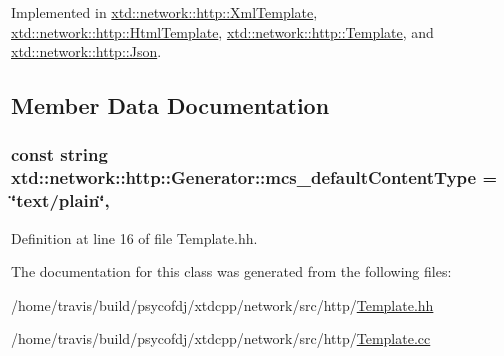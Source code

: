 Implemented in \hyperlink{classxtd_1_1network_1_1http_1_1XmlTemplate_ab221547a643e3db5ba99640fe14b9f68}{xtd\-::network\-::http\-::\-Xml\-Template}, \hyperlink{classxtd_1_1network_1_1http_1_1HtmlTemplate_af621b5bf866fa828f0bd5eaf225d5f70}{xtd\-::network\-::http\-::\-Html\-Template}, \hyperlink{classxtd_1_1network_1_1http_1_1Template_a476ce5e5b8465ea80ade07c003ab5cfd}{xtd\-::network\-::http\-::\-Template}, and \hyperlink{classxtd_1_1network_1_1http_1_1Json_a7a9ed4f957c77813ecbb84e228936b5e}{xtd\-::network\-::http\-::\-Json}.



\subsection{Member Data Documentation}
\hypertarget{classxtd_1_1network_1_1http_1_1Generator_aef564fc3152e7477bb429e45b19328fc}{
\subsubsection[{mcs\-\_\-default\-Content\-Type}]{\setlength{\rightskip}{0pt plus 5cm}const string xtd\-::network\-::http\-::\-Generator\-::mcs\-\_\-default\-Content\-Type = \char`\"{}text/plain\char`\"{}\hspace{0.3cm}{\ttfamily [static]}, {\ttfamily [protected]}}}\label{classxtd_1_1network_1_1http_1_1Generator_aef564fc3152e7477bb429e45b19328fc}


Definition at line 16 of file Template.\-hh.



The documentation for this class was generated from the following files\-:\begin{DoxyCompactItemize}
\item 
/home/travis/build/psycofdj/xtdcpp/network/src/http/\hyperlink{Template_8hh}{Template.\-hh}\item 
/home/travis/build/psycofdj/xtdcpp/network/src/http/\hyperlink{Template_8cc}{Template.\-cc}\end{DoxyCompactItemize}
